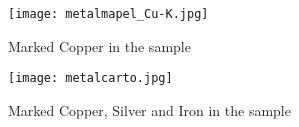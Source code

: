 \begin{figure}[H]
  \centering
  \begin{minipage}[b]{0.48\textwidth}
    \texttt{[image: metalmapel\_Cu-K.jpg]}
    \caption{Marked Copper in the sample}
  \end{minipage}
  \hfill
  \begin{minipage}[b]{0.48\textwidth}
    \texttt{[image: metalcarto.jpg]}
    \caption{Marked Copper, Silver and Iron in the sample}
  \end{minipage}
\end{figure}